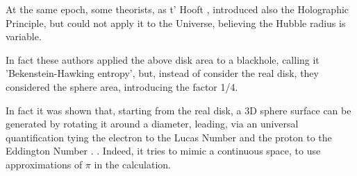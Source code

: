 \documentclass[a4paper,9pt]{article}
\begin{document}
    At the same epoch, some theorists, as t' Hooft \cite{Hooft}, introduced also the Holographic Principle, but could not apply it to the Universe, believing the Hubble radius is variable.
    
    
    In fact these authors applied the above disk area to a blackhole, calling it 'Bekenstein-Hawking entropy'\cite{Bekenstein}, but, instead of consider the real disk, they considered the sphere area, introducing the factor 1/4. 
    
    
    In fact it was shown that, starting from the real disk, a 3D sphere surface can be generated by rotating it around a diameter, leading, via an universal quantification tying the electron to the Lucas Number and the proton to the Eddington Number \cite{Sanchez}. . Indeed, it tries to mimic a continuous space, to use approximations of $\pi$ in  the calculation.
    
\end{document}
